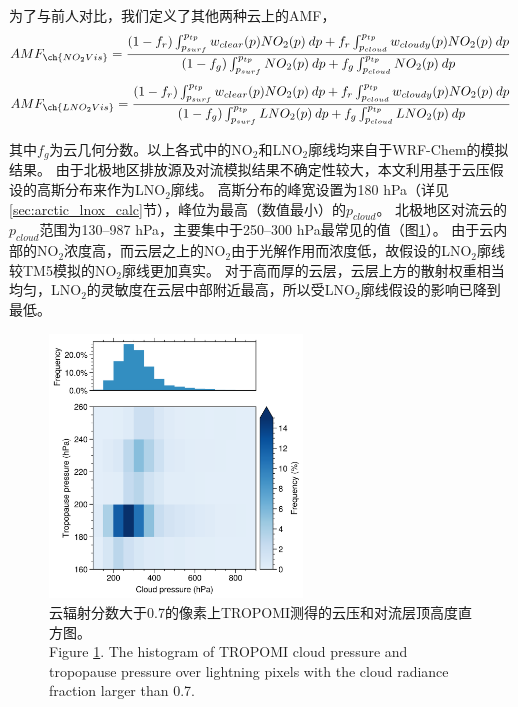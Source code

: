 为了与前人对比，我们定义了其他两种云上的AMF，
\begin{equation} \label{eq:AMF_NO2Vis}
AMF_{\ch{NO_2Vis}} = \frac{(1-f_r) \int_{p_{surf}}^{p_{tp}} w_{clear}(p) NO_2(p) \: dp + f_r \int_{p_{cloud}}^{p_{tp}} w_{cloudy}(p) NO_2(p) \: dp}{(1-f_g) \int_{p_{surf}}^{p_{tp}} NO_2(p) \: dp + f_g \int_{p_{cloud}}^{p_{tp}} NO_2(p) \: dp}
\end{equation}
\begin{equation} \label{eq:AMF_LNO2Vis}
AMF_{\ch{LNO_2Vis}} = \frac{(1-f_r) \int_{p_{surf}}^{p_{tp}} w_{clear}(p) NO_2(p) \: dp + f_r \int_{p_{cloud}}^{p_{tp}} w_{cloudy}(p) NO_2(p) \: dp}{(1-f_g) \int_{p_{surf}}^{p_{tp}} LNO_2(p) \: dp + f_g \int_{p_{cloud}}^{p_{tp}} LNO_2(p) \: dp}
\end{equation}

其中$f_g$为云几何分数。以上各式中的NO$_2$和LNO$_2$廓线均来自于WRF-Chem的模拟结果。
由于北极地区排放源及对流模拟结果不确定性较大，本文利用基于云压假设的高斯分布来作为LNO$_2$廓线。
高斯分布的峰宽设置为180 hPa（详见\ref{sec:arctic_lnox_calc}节），峰位为最高（数值最小）的$p_{cloud}$。
北极地区对流云的$p_{cloud}$范围为130--987 hPa，主要集中于250--300 hPa最常见的值（图\ref{fig:pcld_ptropo}）。
由于云内部的NO$_2$浓度高，而云层之上的NO$_2$由于光解作用而浓度低，故假设的LNO$_2$廓线较TM5模拟的NO$_2$廓线更加真实\citep{Beirle.2009}。
对于高而厚的云层，云层上方的散射权重相当均匀，LNO$_2$的灵敏度在云层中部附近最高，所以受LNO$_2$廓线假设的影响已降到最低\citep{Laughner.2017}。

\begin{figure}[H]
\centering
\includegraphics[width=0.6\textwidth]{./figures/pcld_ptropo.png}
\caption{云辐射分数大于0.7的像素上TROPOMI测得的云压和对流层顶高度直方图。\\
Figure \ref{fig:pcld_ptropo}. The histogram of TROPOMI cloud pressure and tropopause pressure over lightning
pixels with the cloud radiance fraction larger than 0.7.
}
\label{fig:pcld_ptropo}
\end{figure}

